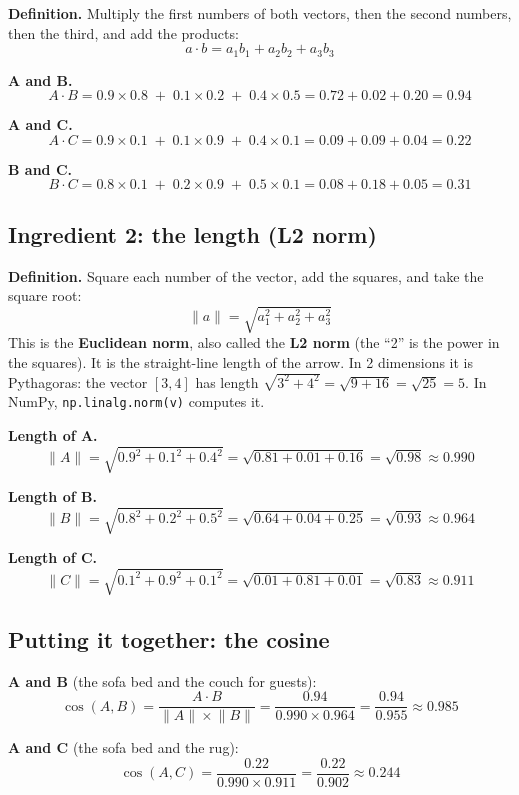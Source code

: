 \documentclass[11pt,a4paper]{article}
\newcommand{\code}[1]{\texttt{#1}}
\begin{document}
\textbf{Definition.} Multiply the first numbers of both vectors, then the
second numbers, then the third, and add the products:
\[
a \cdot b = a_1 b_1 + a_2 b_2 + a_3 b_3
\]

\textbf{A and B.}
\[
A \cdot B = 0.9 \times 0.8 \;+\; 0.1 \times 0.2 \;+\; 0.4 \times 0.5
          = 0.72 + 0.02 + 0.20 = 0.94
\]

\textbf{A and C.}
\[
A \cdot C = 0.9 \times 0.1 \;+\; 0.1 \times 0.9 \;+\; 0.4 \times 0.1
          = 0.09 + 0.09 + 0.04 = 0.22
\]

\textbf{B and C.}
\[
B \cdot C = 0.8 \times 0.1 \;+\; 0.2 \times 0.9 \;+\; 0.5 \times 0.1
          = 0.08 + 0.18 + 0.05 = 0.31
\]

\subsection{Ingredient 2: the length (L2 norm)}

\textbf{Definition.} Square each number of the vector, add the squares,
and take the square root:
\[
\lVert a \rVert = \sqrt{a_1^2 + a_2^2 + a_3^2}
\]
This is the \textbf{Euclidean norm}, also called the \textbf{L2 norm}
(the ``2'' is the power in the squares). It is the straight-line length
of the arrow. In 2 dimensions it is Pythagoras: the vector $[3, 4]$ has
length $\sqrt{3^2 + 4^2} = \sqrt{9 + 16} = \sqrt{25} = 5$. In NumPy,
\code{np.linalg.norm(v)} computes it.

\textbf{Length of A.}
\[
\lVert A \rVert = \sqrt{0.9^2 + 0.1^2 + 0.4^2}
  = \sqrt{0.81 + 0.01 + 0.16} = \sqrt{0.98} \approx 0.990
\]

\textbf{Length of B.}
\[
\lVert B \rVert = \sqrt{0.8^2 + 0.2^2 + 0.5^2}
  = \sqrt{0.64 + 0.04 + 0.25} = \sqrt{0.93} \approx 0.964
\]

\textbf{Length of C.}
\[
\lVert C \rVert = \sqrt{0.1^2 + 0.9^2 + 0.1^2}
  = \sqrt{0.01 + 0.81 + 0.01} = \sqrt{0.83} \approx 0.911
\]

\subsection{Putting it together: the cosine}

\textbf{A and B} (the sofa bed and the couch for guests):
\[
\cos(A, B) = \frac{A \cdot B}{\lVert A \rVert \times \lVert B \rVert}
  = \frac{0.94}{0.990 \times 0.964}
  = \frac{0.94}{0.955}
  \approx \mathbf{0.985}
\]

\textbf{A and C} (the sofa bed and the rug):
\[
\cos(A, C) = \frac{0.22}{0.990 \times 0.911}
  = \frac{0.22}{0.902}
  \approx \mathbf{0.244}
\]
\end{document}
